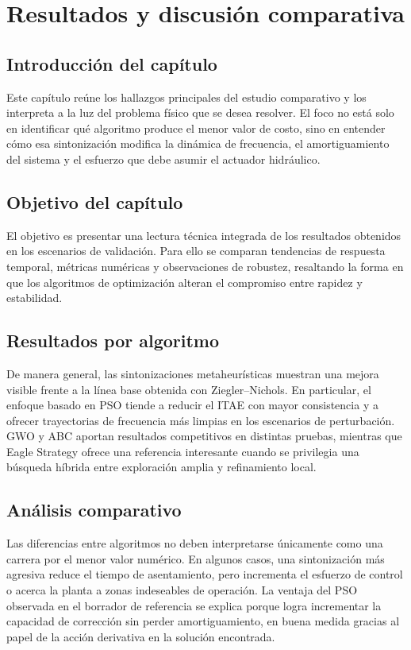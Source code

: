 \chapter{Resultados y discusión comparativa}
\label{ch:resultados-discusion}

\section{Introducción del capítulo}
Este capítulo reúne los hallazgos principales del estudio comparativo y los interpreta a la luz
del problema físico que se desea resolver. El foco no está solo en identificar qué algoritmo
produce el menor valor de costo, sino en entender cómo esa sintonización modifica la dinámica
de frecuencia, el amortiguamiento del sistema y el esfuerzo que debe asumir el actuador
hidráulico.

\section{Objetivo del capítulo}
El objetivo es presentar una lectura técnica integrada de los resultados obtenidos en los
escenarios de validación. Para ello se comparan tendencias de respuesta temporal, métricas
numéricas y observaciones de robustez, resaltando la forma en que los algoritmos de
optimización alteran el compromiso entre rapidez y estabilidad.

\section{Resultados por algoritmo}
De manera general, las sintonizaciones metaheurísticas muestran una mejora visible frente a la
línea base obtenida con Ziegler--Nichols. En particular, el enfoque basado en PSO tiende a
reducir el ITAE con mayor consistencia y a ofrecer trayectorias de frecuencia más limpias en los
escenarios de perturbación. GWO y ABC aportan resultados competitivos en distintas pruebas,
mientras que Eagle Strategy ofrece una referencia interesante cuando se privilegia una búsqueda
híbrida entre exploración amplia y refinamiento local.

\section{Análisis comparativo}
Las diferencias entre algoritmos no deben interpretarse únicamente como una carrera por el
menor valor numérico. En algunos casos, una sintonización más agresiva reduce el tiempo de
asentamiento, pero incrementa el esfuerzo de control o acerca la planta a zonas indeseables de
operación. La ventaja del PSO observada en el borrador de referencia se explica porque logra
incrementar la capacidad de corrección sin perder amortiguamiento, en buena medida gracias al
papel de la acción derivativa en la solución encontrada.

